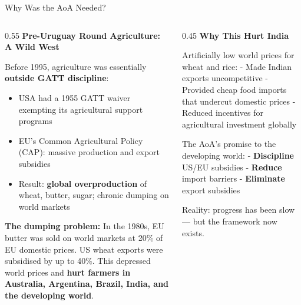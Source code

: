 \documentclass[
  ignorenonframetext,
  aspectratio=169,
]{beamer}
\makeatletter
\providecommand{\tightlist}{%
  \setlength{\itemsep}{0pt}\setlength{\parskip}{0pt}}
\let\quarto@originallabel\label
\DeclareRobustCommand*{\label}[1]{\quarto@originallabel{#1}}
\makeatother
\begin{document}
\begin{frame}{Why Was the AoA Needed?}
\label{why-was-the-aoa-needed}
\begin{columns}[T]
\begin{column}{0.55\linewidth}
\textbf{Pre-Uruguay Round Agriculture: A Wild West}

Before 1995, agriculture was essentially \textbf{outside GATT
discipline}:

\begin{itemize}
\tightlist
\item
  USA had a 1955 GATT waiver exempting its agricultural support programs
\item
  EU's Common Agricultural Policy (CAP): massive production and export
  subsidies
\item
  Result: \textbf{global overproduction} of wheat, butter, sugar;
  chronic dumping on world markets
\end{itemize}

\textbf{The dumping problem:} In the 1980s, EU butter was sold on world
markets at 20\% of EU domestic prices. US wheat exports were subsidised
by up to 40\%. This depressed world prices and \textbf{hurt farmers in
Australia, Argentina, Brazil, India, and the developing world}.
\end{column}

\begin{column}{0.45\linewidth}
\textbf{Why This Hurt India}

Artificially low world prices for wheat and rice: - Made Indian exports
uncompetitive - Provided cheap food imports that undercut domestic
prices - Reduced incentives for agricultural investment globally

The AoA's promise to the developing world: - \textbf{Discipline} US/EU
subsidies - \textbf{Reduce} import barriers - \textbf{Eliminate} export
subsidies

Reality: progress has been slow --- but the framework now exists.
\end{column}
\end{columns}
\end{frame}
\end{document}
